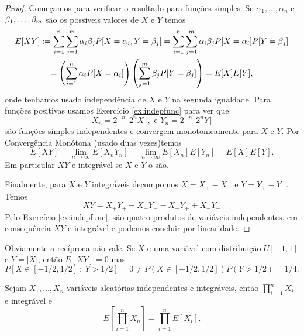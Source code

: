 \begin{proof}
Começamos para verificar o resultado para  funções simples. Se $\alpha_1,\dots,\alpha_n$ e $\beta_1,\dots,\beta_m$ são os possíveis valores de $X$ e $Y$
temos
\begin{multline}
 E[XY]:=\sum_{i=1}^n \sum_{j=1}^m \alpha_i \beta_j P[ X=\alpha_i, Y=\beta_j]
 =  \sum_{i=1}^n \sum_{j=1}^m \alpha_i \beta_j P[ X=\alpha_i] P[Y=\beta_j]\\ = \left( \sum_{i=1}^n \alpha_i P[ X=\alpha_i]\right)
 \left( \sum_{j=1}^m \beta_j P[Y=\beta_j] \right)=E[X]E[Y],
\end{multline}
onde tenhamos usado independência de $X$ e $Y$ na segunda igualdade.
Para funções positivas usamos Exercício \ref{ex:indepfunc} para ver que
$$X_n= 2^{-n} \lfloor 2^n X \rfloor, \text{ e } Y_n= 2^{-n} \lfloor 2^n Y \rfloor $$
são funções simples independentes e convergem monotonicamente para $X$ e $Y$.
Por Convergência Monótona (usado duas vezes)temos
\begin{equation}
 E[XY]=\lim_{n\to \infty} E[X_nY_n]=\lim_{n\to \infty} E[X_n] E[Y_n]=E[X]E[Y].
\end{equation}
Em particular $XY$ e integrável se $X$ e  $Y$ o são.

\medskip

Finalmente, para $X$ e $Y$ integráveis decompomos $X = X_+ - X_-$ e $Y = Y_+ - Y_-$.
Temos
$$XY=X_+Y_+ - X_+Y_- - X_-Y_+ +X_-Y_-$$
Pelo Exercício \ref{ex:indepfunc}, são quatro produtos de variáveis independentes.
em consequência $XY$ e integrável e podemos  concluir por linearidade.
\end{proof}

\begin{remark}
 Obviamente a recíproca não vale. Se $X$ e uma variável com distribuição $U[-1,1]$ e
 $Y=|X|$, então $E[XY]=0$ mas
 $$P[X\in [-1/2,1/2] \ ; \ Y>1/2]=0\ne P(X\in [-1/2,1/2])P(Y>1/2)=1/4.$$


\end{remark}



\begin{corollary}
  Sejam $X_1,\dots,X_n$ variáveis aleatórias independentes e integráveis, então $\prod_{i=1}^n X_i$ e integrável e
  \begin{equation}
    E[\prod_{i=1}^n X_n] = \prod_{i=1}^n E[X_i].
  \end{equation}
  \end{corollary}

